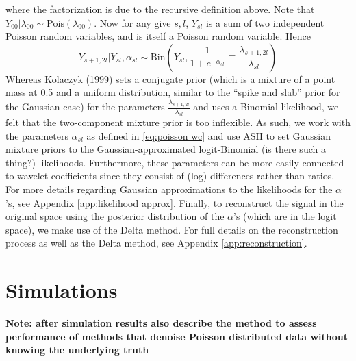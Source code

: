\documentclass[12pt]{article}
\newcommand{\Ga}{\alpha}
\newcommand{\Gl}{\lambda}    \newcommand{\GL}{\Lambda}
\begin{document}
where the factorization is due to the recursive definition above. Note that $Y_{00}|\Gl_{00}\sim \textrm{Pois}(\Gl_{00})$. Now for any give $s,l$, $Y_{sl}$ is a sum of two independent Poisson random variables, and is itself a Poisson random variable. Hence
\[Y_{s+1,2l}|Y_{sl},\Ga_{sl}\sim \textrm{Bin}({Y_{sl},\frac{1}{1+e^{-\Ga_{sl}}}\equiv\frac{\Gl_{s+1,2l}}{\Gl_{sl}}})\]
Whereas Kolaczyk (1999) sets a conjugate prior (which is a mixture of a point mass at 0.5 and a uniform distribution, similar to the ``spike and slab'' prior for the Gaussian case) for the parameters $\frac{\Gl_{s+1,2l}}{\Gl_{sl}}$ and uses a Binomial likelihood, we felt that the two-component mixture prior is too inflexible. As such, we work with the parameters $\Ga_{sl}$ as defined in \eqref{eq:poisson wc} and use ASH to set Gaussian mixture priors to the Gaussian-approximated logit-Binomial (is there such a thing?) likelihoods. Furthermore, these parameters can be more easily connected to wavelet coefficients since they consist of (log) differences rather than ratios. For more details regarding Gaussian approximations to the likelihoods for the $\Ga$'s, see Appendix \ref{app:likelihood approx}. Finally, to reconstruct the signal in the original space using the posterior distribution of the $\Ga$'s (which are in the logit space), we make use of the Delta method. For full details on the reconstruction process as well as the Delta method, see Appendix \ref{app:reconstruction}.
\section{Simulations}
\textbf{Note: after simulation results also describe the method to assess performance of methods that denoise Poisson distributed data without knowing the underlying truth}
\end{document}
